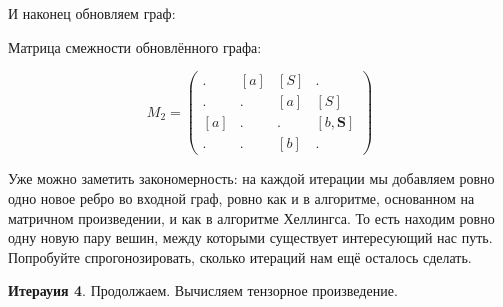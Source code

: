 \begin{example}
И наконец обновляем граф:
\begin{center}
\end{center}

Матрица смежности обновлённого графа:

$$ M_2 =
\begin{pmatrix} 
. & [a] & [S] & . \\
. & . & [a] & [S] \\
[a] & . & . & [b, \textbf{S}] \\
. & . & [b] & . 
\end{pmatrix}
$$

Уже можно заметить закономерность: на каждой итерации мы добавляем ровно одно новое ребро во входной граф, ровно как и в алгоритме, основанном на матричном произведении, и как в алгоритме Хеллингса.
То есть находим ровно одну новую пару вешин, между которыми существует интересующий нас путь.
Попробуйте спрогонозировать, сколько итераций нам ещё осталось сделать.

\textbf{Итерауия 4}.
Продолжаем. Вычисляем тензорное произведение.


\end{example}
